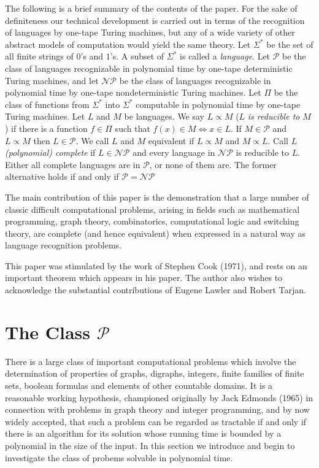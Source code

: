 \documentclass{scrartcl}
\begin{document}
The following is a brief summary of the contents of the paper. For the sake of definiteness our technical development is carried out in terms
of the recognition of languages by one-tape Turing machines, but any of a wide variety of other abstract models of computation would yield the
same theory. Let \(\Sigma^{*}\) be the set of all finite strings of \(0\)'s and \(1\)'s. A subset of \(\Sigma^{*}\) is called a \emph{language}.
Let \(\mathcal{P}\) be the class of languages recognizable in polynomial time by one-tape deterministic Turing machines, and let \(\mathcal{NP}\)
be the class of languages recognizable in polynomial time by one-tape nondeterministic Turing machines. Let \(\Pi\) be the class of functions from
\(\Sigma^{*}\) into \(\Sigma^{*}\) computable in polynomial time by one-tape Turing machines. Let \(L\) and \(M\) be languages. We say \(L \propto M\)
(\(L\) \emph{is reducible to} \(M\)) if there is a function \(f \in \Pi\) such that \(f(x) \in M \Leftrightarrow x \in L\). If \(M \in \mathcal{P}\)
and \(L \propto M\) then \(L \in \mathcal{P}\). We call \(L\) and \(M\) equivalent if \(L \propto M\) and \(M \propto L\). Call \(L\) \emph{(polynomial)
complete} if \(L \in \mathcal{NP}\) and every language in \(\mathcal{NP}\) is reducible to \(L\). Either all complete languages are in \(\mathcal{P}\),
or none of them are. The former alternative holds if and only if \(\mathcal{P} = \mathcal{NP}\)

The main contribution of this paper is the demonstration that a large number of classic difficult computational problems, arising in fields such
as mathematical programming, graph theory, combinatorics, computational logic and switching theory, are complete (and hence equivalent) when
expressed in a natural way as language recognition problems.

This paper was stimulated by the work of Stephen Cook (1971), and rests on an important theorem which appears in his paper.
The author also wishes to acknowledge the substantial contributions of Eugene Lawler and Robert Tarjan.

\section{The Class \(\mathcal{P}\)}

There is a large class of important computational problems which involve the determination of properties of graphs, digraphs, integers, finite families
of finite sets, boolean formulas and elements of other countable domains. It is a reasonable working hypothesis, championed originally by Jack Edmonds
(1965) in connection with problems in graph theory and integer programming, and by now widely accepted, that such a problem can be regarded as tractable
if and only if there is an algorithm for its solution whose running time is bounded by a polynomial in the size of the input. In this section we introduce
and begin to investigate the class of probems solvable in polynomial time.
\end{document}
